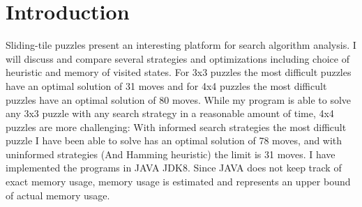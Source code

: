 \documentclass{article}
\begin{document}
	\section{Introduction}
	    Sliding-tile puzzles present an interesting platform for search algorithm analysis.  I will discuss and compare several strategies and optimizations including choice of heuristic and memory of visited states.  For 3x3 puzzles the most difficult puzzles have an optimal solution of 31 moves and for 4x4 puzzles the most difficult puzzles have an optimal solution of 80 moves.  While my program is able to solve any 3x3 puzzle with any search strategy in a reasonable amount of time, 4x4 puzzles are more challenging:  With informed search strategies the most difficult puzzle I have been able to solve has an optimal solution of 78 moves, and with uninformed strategies (And Hamming heuristic) the limit is 31 moves.  I have implemented the programs in JAVA JDK8.  Since JAVA does not keep track of exact memory usage, memory usage is estimated and represents an upper bound of actual memory usage.
\end{document}
